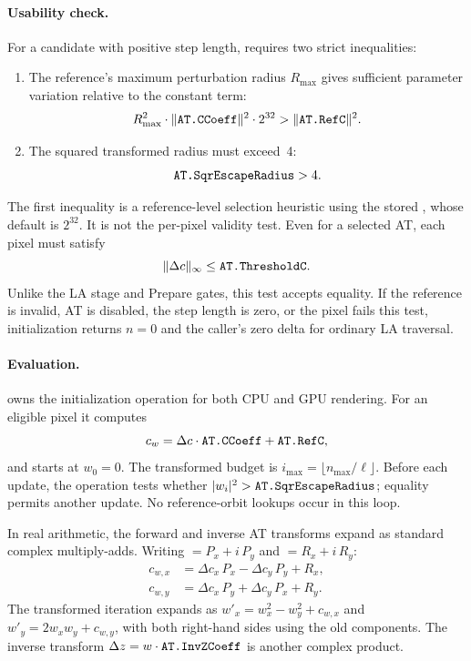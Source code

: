 \paragraph{Usability check.}
\label{sec:at-usability}
For a candidate with positive step length, 
requires two strict inequalities:
\begin{enumerate}
  \item The reference's maximum perturbation radius $R_{\max}$ gives
        sufficient parameter variation relative to the constant term:
        \[
        R_{\max}^2 \cdot \lVert\texttt{AT.CCoeff}\rVert^2 \cdot 2^{32}
          > \lVert\texttt{AT.RefC}\rVert^2.
        \]
  \item The squared transformed radius must exceed~4:
        \[
        \texttt{AT.SqrEscapeRadius}>4.
        \]
\end{enumerate}
The first inequality is a reference-level selection heuristic using
the stored , whose default is $2^{32}$. It is not the
per-pixel validity test. Even for a selected AT, each pixel must satisfy
\[
\lVert\Delta c\rVert_\infty\le\texttt{AT.ThresholdC}.
\]
Unlike the LA stage and Prepare gates, this test accepts equality.
If the reference is invalid, AT is disabled, the step length is zero,
or the pixel fails this test, initialization returns $n=0$ and the
caller's zero delta for ordinary LA traversal.

\paragraph{Evaluation.}
 owns the initialization operation for
both CPU and GPU rendering. For an eligible pixel it computes
\[
c_w = \Delta c \cdot \texttt{AT.CCoeff} + \texttt{AT.RefC},
\]
and starts at $w_0=0$. The transformed budget is
$i_{\max}=\lfloor n_{\max}/\ell\rfloor$. Before each update, the
operation tests whether $|w_i|^2>\texttt{AT.SqrEscapeRadius}$; equality
permits another update. No reference-orbit lookups occur in this loop.

In real arithmetic, the forward and inverse AT transforms expand as standard
complex multiply-adds.  Writing  $= P_x + i\,P_y$ and
 $= R_x + i\,R_y$:
\begin{align}
c_{w,x} &= \Delta c_x\,P_x - \Delta c_y\,P_y + R_x, \\
c_{w,y} &= \Delta c_x\,P_y + \Delta c_y\,P_x + R_y.
\end{align}
The transformed iteration expands as
$w'_x=w_x^2-w_y^2+c_{w,x}$ and
$w'_y=2w_xw_y+c_{w,y}$, with both right-hand sides using the old
components. The inverse transform
$\Delta z = w \cdot \texttt{AT.InvZCoeff}$ is another complex product.

